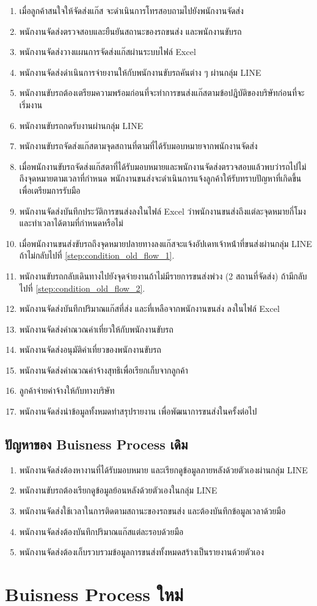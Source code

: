 \begin{enumerate}
    \item เมื่อลูกค้าสนใจให้จัดส่งแก๊ส จะดำเนินการโทรสอบถามไปยังพนักงานจัดส่ง
    \item พนักงานจัดส่งตรวจสอบและยืนยันสถานะของรถขนส่ง และพนักงานขับรถ
    \item พนักงานจัดส่งวางแผนการจัดส่งแก๊สผ่านระบบไฟล์ Excel
    \item พนักงานจัดส่งดำเนินการจ่ายงานให้กับพนักงานขับรถคันต่าง ๆ ผ่านกลุ่ม LINE
    \item พนักงานขับรถต้องเตรียมความพร้อมก่อนที่จะทำการขนส่งแก๊สตามข้อปฎิบัติของบริษัทก่อนที่จะเริ่มงาน
    \item พนักงานขับรถกดรับงานผ่านกลุ่ม LINE
    \item พนักงานขับรถจัดส่งแก๊สตามจุดสถานที่ตามที่ได้รับมอบหมายจากพนักงานจัดส่ง \label{step:condition_old_flow_2}
    \item เมื่อพนักงานขับรถจัดส่งแก๊สตาที่ได้รับมอบหมายและพนักงานจัดส่งตรวจสอบแล้วพบว่ารถไปไม่ถึงจุดหมายตามเวลาที่กำหนด พนักงานขนส่งจะดำเนินการแจ้งลูกค้าให้รับทราบปัญหาที่เกิดขึ้นเพื่อเตรียมการรับมือ \label{step:condition_old_flow_1}
    \item พนักงานจัดส่งบันทึกประวัติการขนส่งลงในไฟล์ Excel ว่าพนักงานขนส่งถึงแต่ละจุดหมายกี่โมง และทำเวลาได้ตามที่กำหนดหรือไม่
    \item เมื่อพนักงานขนส่งขับรถถึงจุดหมายปลายทางลงแก๊สจะแจ้งอัปเดทเจ้าหน้่าที่ขนส่งผ่านกลุ่ม LINE ถ้าไม่กลับไปที่ \ref{step:condition_old_flow_1}.
    \item พนักงานขับรถกลับเดินทางไปยังจุดจ่ายงานถ้าไม่มีรายการขนส่งพ่วง (2 สถานที่จัดส่ง) ถ้ามีกลับไปที่ \ref{step:condition_old_flow_2}.
    \item พนักงานจัดส่งบันทึกปริมาณแก๊สที่ส่ง และที่เหลือจากพนักงานขนส่ง ลงในไฟล์ Excel
    \item พนักงานจัดส่งคำณวณค่าเที่ยวให้กับพนักงานขับรถ
    \item พนักงานจัดส่งอนุมัติค่าเที่ยวของพนักงานขับรถ
    \item พนักงานจัดส่งคำณวณค่าจ้างสุทธิเพื่อเรียกเก็บจากลูกค้า
    \item ลูกค้าจ่ายค่าจ้างให้กับทางบริษัท
    \item พนักงานจัดส่งนำข้อมูลทั้งหมดทำสรุปรายงาน เพื่อพัฒนาการขนส่งในครั้งต่อไป
\end{enumerate}

\subsection{ปัญหาของ Buisness Process เดิม}
\begin{enumerate}
    \item พนักงานจัดส่งต้องหางานที่ได้รับมอบหมาย และเรียกดูข้อมูลภายหลังด้วยตัวเองผ่านกลุ่ม LINE
    \item พนักงานขับรถต้องเรียกดูข้อมูลย้อนหลังด้วยตัวเองในกลุ่ม LINE
    \item พนักงานจัดส่งใช้เวลาในการติดตามสถานะของรถขนส่ง และต้องบันทึกข้อมูลเวลาด้วยมือ
    \item พนักงานจัดส่งต้องบันทึกปริมาณแก๊สแต่ละรอบด้วยมือ
    \item พนักงานจัดส่งต้องเก็บรวบรวมข้อมูลการขนส่งทั้งหมดสร้างเป็นรายงานด้วยตัวเอง
\end{enumerate}


\section{Buisness Process ใหม่}
